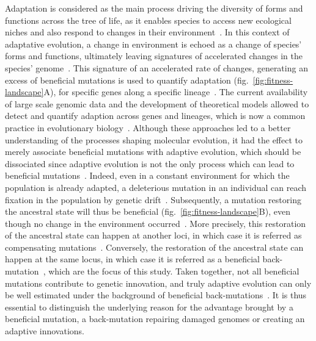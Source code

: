 \documentclass{article}
\begin{document}
    Adaptation is considered as the main process driving the diversity of forms and functions across the tree of life, as it enables species to access new ecological niches and also respond to changes in their environment~\cite{darwin_origin_1859}.
    In this context of adaptative evolution, a change in environment is echoed as a change of species' forms and functions, ultimately leaving signatures of accelerated changes in the species' genome~\cite{merrell_adaptive_1994}.
    This signature of an accelerated rate of changes, generating an excess of beneficial mutations is used to quantify adaptation (fig.~\ref{fig:fitness-landscape}A), for specific genes along a specific lineage~\cite{mcdonald_adaptative_1991, smith_adaptive_2002a, welch_estimating_2006}.
    The current availability of large scale genomic data and the development of theoretical models allowed to detect and quantify adaption across genes and lineages, which is now a common practice in evolutionary biology~\cite{yang_statistical_2000, eyre-walker_genomic_2006, moutinho_variation_2019}.
    Although these approaches led to a better understanding of the processes shaping molecular evolution, it had the effect to merely associate beneficial mutations with adaptive evolution, which should be dissociated since adaptive evolution is not the only process which can lead to beneficial mutations~\cite{charlesworth_other_2007, mustonen_fitness_2009}.
    Indeed, even in a constant environment for which the population is already adapted, a deleterious mutation in an individual can reach fixation in the population by genetic drift~\cite{Ohta1992}.
    Subsequently, a mutation restoring the ancestral state will thus be beneficial (fig.~\ref{fig:fitness-landscape}B), even though no change in the environment occurred~\cite{hartl_compensatory_1996, sella_application_2005, mustonen_fitness_2009, cvijovic_fate_2015}.
    More precisely, this restoration of the ancestral state can happen at another loci, in which case it is referred as compensating mutations~\cite{hartl_compensatory_1996, mustonen_fitness_2009}.
    Conversely, the restoration of the ancestral state can happen at the same locus, in which case it is referred as a beneficial back-mutation~\cite{piganeau_estimating_2003, charlesworth_other_2007}, which are the focus of this study.
    Taken together, not all beneficial mutations contribute to genetic innovation, and truly adaptive evolution can only be well estimated under the background of beneficial back-mutations~\cite{keightley_what_2010, rice_evolutionarily_2015}.
    It is thus essential to distinguish the underlying reason for the advantage brought by a beneficial mutation, a back-mutation repairing damaged genomes or creating an adaptive innovations.
\end{document}
